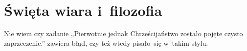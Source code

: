\documentclass[a4paper,11pt]{article}
\begin{document}










\section{Święta wiara i~filozofia}

\vspace{\spaceTwo}










\start {} Nie wiem czy zadanie „Pierwotnie jednak
Chrześcijaństwo zostało pojęte czysto zaprzeczenie.” zawiera błąd,
czy też wtedy pisało~się w~takim stylu.

\vspace{\spaceFour}


\end{document}
